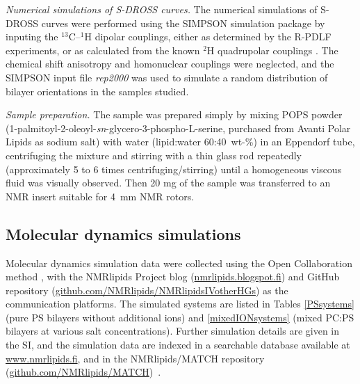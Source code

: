 \documentclass[journal=jpcbfk,manuscript=article]{achemso}
\begin{document}
\emph{Numerical simulations of S-DROSS curves.}
The numerical simulations of S-DROSS curves were performed using the SIMPSON simulation package \cite{bak00}
by inputing the $^{13}$C--$^1$H
dipolar couplings, either as determined by the R-PDLF experiments, or as calculated from the known $^2$H quadrupolar couplings \cite{browning80}.
The chemical shift anisotropy and homonuclear couplings were neglected, and the SIMPSON input file {\it{rep2000}} was used to simulate a random
distribution of bilayer orientations in the samples studied.

\emph{Sample preparation.}
The sample was prepared simply by mixing POPS powder (1-palmitoyl-2-oleoyl-{\it sn}-glycero-3-phospho-L-serine, purchased from Avanti Polar Lipids
as sodium salt) with water (lipid:water 60:40~wt-\%) in an Eppendorf tube, centrifuging the mixture and stirring with a thin glass rod repeatedly (approximately 5 to 6 times centrifuging/stirring) until a homogeneous viscous fluid was visually observed. Then 20 mg of the sample was transferred to an NMR insert suitable for 4~mm NMR rotors.  


\subsection{Molecular dynamics simulations}
Molecular dynamics simulation data were collected using
the Open Collaboration method \cite{botan15}, with
the NMR\-lipids Project blog (\url{nmrlipids.blogspot.fi}) and
GitHub repository (\url{github.com/NMRlipids/NMRlipidsIVotherHGs})
as the communication platforms.
The simulated systems are listed in 
Tables \ref{PSsystems} (pure PS bilayers without additional ions) 
and \ref{mixedIONsystems} (mixed PC:PS bilayers at various salt concentrations).
Further simulation details are given in the SI, and
the simulation data are indexed in a
searchable database available at \url{www.nmrlipids.fi},
and in the NMRlipids/MATCH repository (\url{github.com/NMRlipids/MATCH})~\cite{MATCHgit}.
\end{document}
